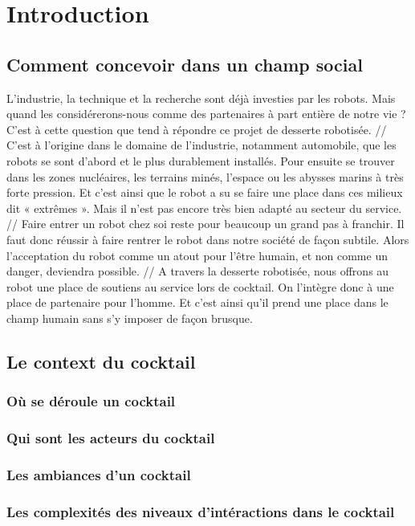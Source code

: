 \chapter*{Introduction}


\section{Comment concevoir dans un champ social}

L’industrie, la technique et la recherche sont déjà investies par les robots. Mais quand les considérerons-nous comme des partenaires à part entière de notre vie ? C’est à cette question que tend à répondre ce projet de desserte robotisée.
//
C’est à l’origine dans le domaine de l’industrie, notamment automobile, que les robots se sont d’abord et le plus durablement installés. Pour ensuite se trouver dans les zones nucléaires, les terrains minés, l’espace ou les abysses marins à très forte pression. Et c’est ainsi que le robot a su se faire une place dans ces milieux dit « extrêmes ». Mais il n’est pas encore très bien adapté au secteur du service.
//
Faire entrer un robot chez soi reste pour beaucoup un grand pas à franchir. Il faut donc réussir à faire rentrer le robot dans notre société de façon subtile. Alors l’acceptation du robot comme un atout pour l’être humain, et non comme un danger, deviendra possible.
//
A travers la desserte robotisée, nous offrons au robot une place de soutiens au service lors de cocktail. On l’intègre donc à une place de partenaire pour l’homme. Et c’est ainsi qu’il prend une place dans le champ humain sans s’y imposer de façon brusque.


\section{Le context du cocktail}

\subsection{Où se déroule un cocktail}

\subsection{Qui sont les acteurs du cocktail}

\subsection{Les ambiances d'un cocktail}

\subsection{Les complexités des niveaux d'intéractions dans le cocktail}
